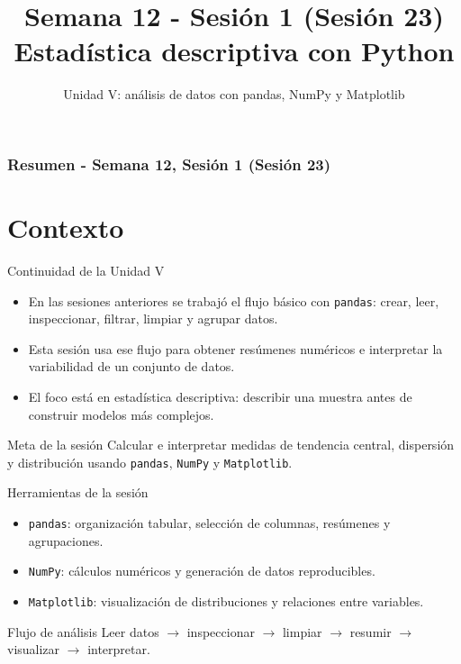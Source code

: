 \documentclass[10pt]{beamer}
\title[Semana 12 - P1]{Semana 12 - Sesión 1 (Sesión 23)\\Estadística descriptiva con Python}
\subtitle{Unidad V: análisis de datos con pandas, NumPy y Matplotlib}
\begin{document}
\myfront{}

\begin{frame}
  \titlepage
\end{frame}

\begin{frame}
  \frametitle{Resumen - Semana 12, Sesión 1 (Sesión 23)}
  \tableofcontents
\end{frame}


\section{Contexto}

\begin{frame}{Continuidad de la Unidad V}
  \begin{itemize}
    \item En las sesiones anteriores se trabajó el flujo básico con \texttt{pandas}: crear, leer, inspeccionar, filtrar, limpiar y agrupar datos.
    \item Esta sesión usa ese flujo para obtener resúmenes numéricos e interpretar la variabilidad de un conjunto de datos.
    \item El foco está en estadística descriptiva: describir una muestra antes de construir modelos más complejos.
  \end{itemize}
  \begin{alertblock}{Meta de la sesión}
    Calcular e interpretar medidas de tendencia central, dispersión y distribución usando \texttt{pandas}, \texttt{NumPy} y \texttt{Matplotlib}.
  \end{alertblock}
\end{frame}

\begin{frame}{Herramientas de la sesión}
  \begin{itemize}
    \item \texttt{pandas}: organización tabular, selección de columnas, resúmenes y agrupaciones.
    \item \texttt{NumPy}: cálculos numéricos y generación de datos reproducibles.
    \item \texttt{Matplotlib}: visualización de distribuciones y relaciones entre variables.
  \end{itemize}
  \begin{block}{Flujo de análisis}
    Leer datos \(\rightarrow\) inspeccionar \(\rightarrow\) limpiar \(\rightarrow\) resumir \(\rightarrow\) visualizar \(\rightarrow\) interpretar.
  \end{block}
\end{frame}
\end{document}
